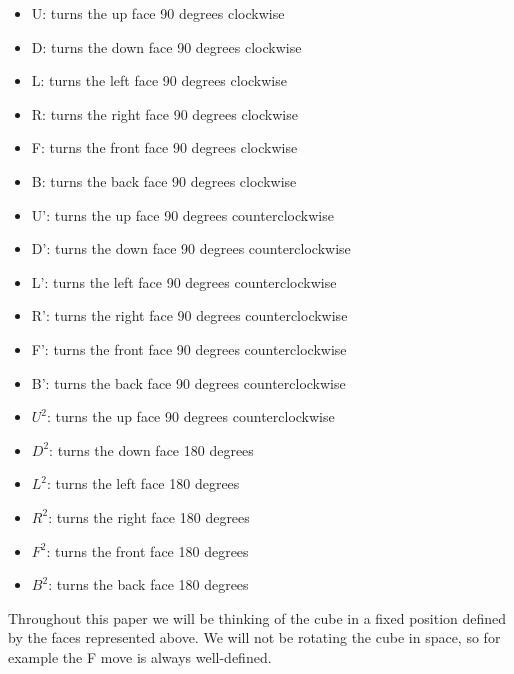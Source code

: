 \documentclass{article}
\begin{document}
\begin{itemize}
    \item U: turns the up face 90 degrees clockwise
    \item D: turns the down face 90 degrees clockwise
    \item L: turns the left face 90 degrees clockwise
    \item R: turns the right face 90 degrees clockwise
    \item F: turns the front face 90 degrees clockwise
    \item B: turns the back face 90 degrees clockwise
    \item U': turns the up face 90 degrees counterclockwise
    \item D': turns the down face 90 degrees counterclockwise
    \item L': turns the left face 90 degrees counterclockwise
    \item R': turns the right face 90 degrees counterclockwise
    \item F': turns the front face 90 degrees counterclockwise
    \item B': turns the back face 90 degrees counterclockwise
    \item $U^2$: turns the up face 90 degrees counterclockwise
    \item $D^2$: turns the down face 180 degrees 
    \item $L^2$: turns the left face 180 degrees 
    \item $R^2$: turns the right face 180 degrees 
    \item $F^2$: turns the front face 180 degrees
    \item $B^2$: turns the back face 180 degrees
\end{itemize}

Throughout this paper we will be thinking of the cube in a fixed position defined by the faces represented above.  We will not be rotating the cube in space, so for example the F move is always well-defined.
\end{document}
